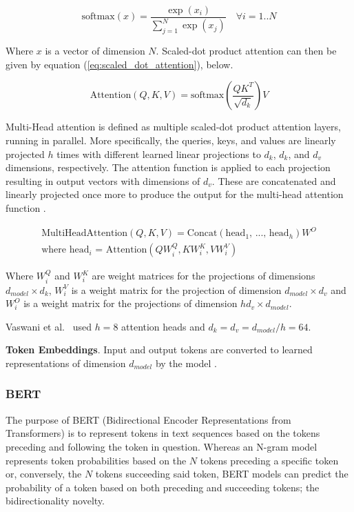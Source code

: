 \documentclass[12pt]{article}
\begin{document}
\begin{equation}\label{eq:softmax}
    \mbox{softmax}(x) = \frac{\exp(x_i)}{\sum_{j=1}^{N}\exp(x_j)} \quad \forall i=1..N
\end{equation}

\noindent
Where $x$ is a vector of dimension $N$. Scaled-dot product attention can then be given by equation (\ref{eq:scaled_dot_attention}), below.

\begin{equation}\label{eq:scaled_dot_attention}
    \mbox{Attention}(Q,K,V) = \mbox{softmax}\left(\frac{QK^T}{\sqrt{d_k}}\right)V
\end{equation}

Multi-Head attention is defined as multiple scaled-dot product attention layers, running in parallel. More specifically, the queries, keys, and values
are linearly projected $h$ times with different learned linear projections to $d_k$, $d_k$, and $d_v$ dimensions, respectively. The attention function
is applied to each projection resulting in output vectors with dimensions of $d_v$. These are concatenated and linearly projected once more to produce
the output for the multi-head attention function \cite{vaswani_attention_2017}.

\begin{equation}\label{eq:multi_head_attention}
    \begin{gathered}
        \mbox{MultiHeadAttention}(Q,K,V) = \mbox{Concat}(\mbox{head$_1$, ..., head$_h$})W^O\\
        \mbox{where head$_i$ = Attention}(QW_i^Q, KW_i^K, VW_i^V)
    \end{gathered}
\end{equation}

\noindent
Where $W_i^Q$ and $W_i^K$ are weight matrices for the projections of dimensions $d_{model} \times d_k$, $W_i^V$ is a weight matrix for the projection
of dimension $d_{model} \times d_v$ and $W_i^O$ is a weight matrix for the projections of dimension $h d_v \times d_{model}$.

Vaswani et al.~\cite{vaswani_attention_2017} used $h = 8$ attention heads and $d_k = d_v = d_{model} / h = 64$.

\textbf{Token Embeddings}. Input and output tokens are converted to learned representations of dimension $d_{model}$ by the model
\cite{vaswani_attention_2017}.

\subsubsection{BERT}\label{sec:bert}
The purpose of BERT (Bidirectional Encoder Representations from Transformers) is to represent tokens in text sequences based on the tokens preceding
and following the token in question. Whereas an N-gram model represents token probabilities based on the $N$ tokens preceding a specific token or,
conversely, the $N$ tokens succeeding said token, BERT models can predict the probability of a token based on both preceding and succeeding tokens;
the bidirectionality novelty.
\end{document}
